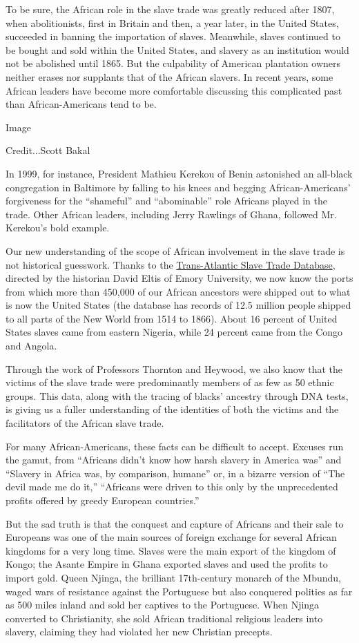To be sure, the African role in the slave trade was greatly reduced
after 1807, when abolitionists, first in Britain and then, a year later,
in the United States, succeeded in banning the importation of slaves.
Meanwhile, slaves continued to be bought and sold within the United
States, and slavery as an institution would not be abolished until 1865.
But the culpability of American plantation owners neither erases nor
supplants that of the African slavers. In recent years, some African
leaders have become more comfortable discussing this complicated past
than African-Americans tend to be.

Image

Credit...Scott Bakal

In 1999, for instance, President Mathieu Kerekou of Benin astonished an
all-black congregation in Baltimore by falling to his knees and begging
African-Americans' forgiveness for the ``shameful'' and ``abominable''
role Africans played in the trade. Other African leaders, including
Jerry Rawlings of Ghana, followed Mr. Kerekou's bold example.

Our new understanding of the scope of African involvement in the slave
trade is not historical guesswork. Thanks to the
\href{http://www.slavevoyages.org/tast/index.faces}{Trans-Atlantic Slave
Trade Database}, directed by the historian David Eltis of Emory
University, we now know the ports from which more than 450,000 of our
African ancestors were shipped out to what is now the United States (the
database has records of 12.5 million people shipped to all parts of the
New World from 1514 to 1866). About 16 percent of United States slaves
came from eastern Nigeria, while 24 percent came from the Congo and
Angola.

Through the work of Professors Thornton and Heywood, we also know that
the victims of the slave trade were predominantly members of as few as
50 ethnic groups. This data, along with the tracing of blacks' ancestry
through DNA tests, is giving us a fuller understanding of the identities
of both the victims and the facilitators of the African slave trade.

For many African-Americans, these facts can be difficult to accept.
Excuses run the gamut, from ``Africans didn't know how harsh slavery in
America was'' and ``Slavery in Africa was, by comparison, humane'' or,
in a bizarre version of ``The devil made me do it,'' ``Africans were
driven to this only by the unprecedented profits offered by greedy
European countries.''

But the sad truth is that the conquest and capture of Africans and their
sale to Europeans was one of the main sources of foreign exchange for
several African kingdoms for a very long time. Slaves were the main
export of the kingdom of Kongo; the Asante Empire in Ghana exported
slaves and used the profits to import gold. Queen Njinga, the brilliant
17th-century monarch of the Mbundu, waged wars of resistance against the
Portuguese but also conquered polities as far as 500 miles inland and
sold her captives to the Portuguese. When Njinga converted to
Christianity, she sold African traditional religious leaders into
slavery, claiming they had violated her new Christian precepts.


